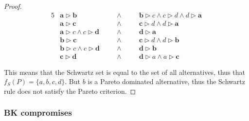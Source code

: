 \begin{proof}
\begin{minipage}{.45\textwidth}
{
		}
	\end{minipage}
	\begin{minipage}{.45\textwidth}
		\raggedleft
	\begin{alignat*}{5}
		&\mathbf{a} \rhd \mathbf{b} && \land \quad &&\mathbf{b} \rhd c \land c \rhd d \land d \rhd \mathbf{a}\\
		&\mathbf{a} \rhd \mathbf{c} &&\land \ && \mathbf{c} \rhd d \land d \rhd \mathbf{a}\\
		&\mathbf{a} \rhd c \land c \rhd \mathbf{d} \quad &&\land \ &&\mathbf{d} \rhd \mathbf{a} \\		
		&\mathbf{b} \rhd \mathbf{c} &&\land \ &&\mathbf{c} \rhd d \land d \rhd \mathbf{b} \\
		&\mathbf{b} \rhd c \land c \rhd \mathbf{d} &&\land \ &&\mathbf{d} \rhd \mathbf{b} \\	
		&\mathbf{c} \rhd \mathbf{d} &&\land \ &&\mathbf{d} \rhd a \land a \rhd \mathbf{c}
	\end{alignat*}
\end{minipage}
	
	\vspace{2em}
	\noindent
	This means that the Schwartz set is equal to the set of all alternatives, thus that $f_S(P)=\{a,b,c,d\}$. But $b$ is a Pareto dominated alternative, thus the Schwartz rule does not satisfy the Pareto criterion.
\end{proof}



\subsubsection*{BK compromises}
\begin{indented}
\end{indented}



